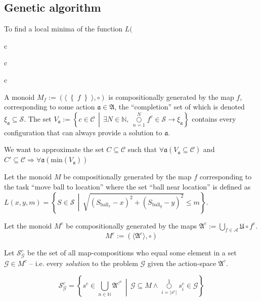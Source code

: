 \subsection{Genetic algorithm}
To find a local minima of the function \(L(\)


c

c

c


A monoid \(M_f:=\left(\langle \right\{ f \left\} \rangle,\circ\right)\) is compositionally generated by the map \(f\), corresponding to some action \(\mathfrak{a}\in\mathfrak{A}\), the ``completion'' set of which is denoted \(\xi_\mathfrak{a}\subseteq\mathcal{S}\). The set \(V_\mathfrak{a} := \left\{ c\in\mathcal{C} \,\middle|\, \exists N\in\mathbb{N},\, \overset{N}{\underset{n=1}\bigcirc} f^c \in \mathcal{S} \to \xi_\mathfrak{a} \right\}\) contains every configuration that can always provide a solution to \(\mathfrak{a}\).

We want to approximate the set \(C\subseteq\mathcal{C}\) such that \( \forall \mathfrak{a} \left( V_\mathfrak{a}\subseteq\mathcal{C} \right)\) and \(C'\subseteq\mathcal{C} \Rightarrow \forall \mathfrak{a} \left( \text{min} \left( V_\mathfrak{a} \right) \right)\)

Let the monoid \(M\) be compositionally generated by the map \(f\) corresponding to the task ``move ball to location'' where the set ``ball near location'' is defined as \(L(x,y,m) = \left\{ S \in \mathcal{S} \,\middle|\, \sqrt{ \left(S_{\text{ball}_x} - x\right)^2 + \left(S_{\text{ball}_y} - y\right)^2 } \le m \right\}\).



Let the monoid \(M^c\) be compositionally generated by the maps \(\mathfrak{A}^c := \bigcup_{f\in\mathcal{A}} \mathfrak{U}\circ f^c\).
\begin{equation}
		M^c:=\left(\langle\mathfrak{A}^c\rangle,\circ\right)
\end{equation}

Let \(\mathscr{S}^c_\mathcal{G}\) be the set of all map-compositions who equal some element in a set \(\mathcal{G}\in M^c\) -- i.e. every \textit{solution} to the problem \(\mathcal{G}\) given the action-space \(\mathfrak{A}^c\).

\begin{equation}
		\mathscr{S}^c_\mathcal{G} = \left\{ s^c \in \bigcup_{n\in \mathbb{N}}\mathfrak{A}^{c^n} \,\middle|\, \mathcal{G}\subseteq M\wedge\overset{1}{\underset{i=|s^c|}\bigcirc} s^c_i \in \mathcal{G} \right\}
\end{equation}

